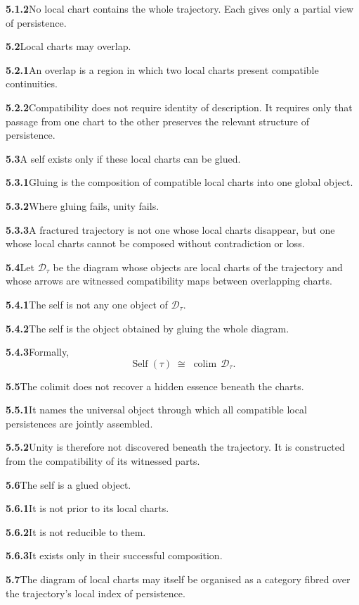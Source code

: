 \documentclass[11pt,a4paper]{book}
\newcommand{\prop}[2]{\noindent\textbf{#1}\enspace #2\par\medskip}
\DeclareMathOperator{\Self}{Self}
\begin{document}
\prop{5.1.2}{No local chart contains the whole trajectory. Each gives only a partial view of persistence.}

\prop{5.2}{Local charts may overlap.}

\prop{5.2.1}{An overlap is a region in which two local charts present compatible continuities.}

\prop{5.2.2}{Compatibility does not require identity of description. It requires only that passage from one chart to the other preserves the relevant structure of persistence.}

\prop{5.3}{A self exists only if these local charts can be glued.}

\prop{5.3.1}{Gluing is the composition of compatible local charts into one global object.}

\prop{5.3.2}{Where gluing fails, unity fails.}

\prop{5.3.3}{A fractured trajectory is not one whose local charts disappear, but one whose local charts cannot be composed without contradiction or loss.}

\prop{5.4}{Let \(\mathcal{D}_{\tau}\) be the diagram whose objects are local charts of the trajectory and whose arrows are witnessed compatibility maps between overlapping charts.}

\prop{5.4.1}{The self is not any one object of \(\mathcal{D}_{\tau}\).}

\prop{5.4.2}{The self is the object obtained by gluing the whole diagram.}

\prop{5.4.3}{Formally,
\[
\Self(\tau)\;\cong\;\operatorname{colim}\,\mathcal{D}_{\tau}.
\]}

\prop{5.5}{The colimit does not recover a hidden essence beneath the charts.}

\prop{5.5.1}{It names the universal object through which all compatible local persistences are jointly assembled.}

\prop{5.5.2}{Unity is therefore not discovered beneath the trajectory. It is constructed from the compatibility of its witnessed parts.}

\prop{5.6}{The self is a glued object.}

\prop{5.6.1}{It is not prior to its local charts.}

\prop{5.6.2}{It is not reducible to them.}

\prop{5.6.3}{It exists only in their successful composition.}

\prop{5.7}{The diagram of local charts may itself be organised as a category fibred over the trajectory's local index of persistence.}
\end{document}
